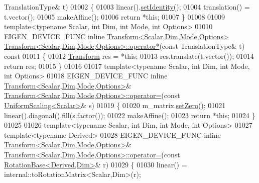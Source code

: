 \begin{DoxyCode}
      TranslationType& t)
01002 \{
01003   linear().\hyperlink{group___geometry___module_a4f0c6b74994904b56b621cf3d9ac4a0f}{setIdentity}();
01004   translation() = t.vector();
01005   makeAffine();
01006   \textcolor{keywordflow}{return} *\textcolor{keyword}{this};
01007 \}
01008 
01009 \textcolor{keyword}{template}<\textcolor{keyword}{typename} Scalar, \textcolor{keywordtype}{int} Dim, \textcolor{keywordtype}{int} Mode, \textcolor{keywordtype}{int} Options>
01010 EIGEN\_DEVICE\_FUNC \textcolor{keyword}{inline} \hyperlink{group___geometry___module_class_eigen_1_1_transform}{Transform<Scalar,Dim,Mode,Options>} 
      \hyperlink{group___geometry___module_a4e44db730819ead6e555cf325cea3fd6}{Transform<Scalar,Dim,Mode,Options>::operator*}(\textcolor{keyword}{const} 
      TranslationType& t)\textcolor{keyword}{ const}
01011 \textcolor{keyword}{}\{
01012   \hyperlink{group___geometry___module_class_eigen_1_1_transform}{Transform} res = *\textcolor{keyword}{this};
01013   res.translate(t.vector());
01014   \textcolor{keywordflow}{return} res;
01015 \}
01016 
01017 \textcolor{keyword}{template}<\textcolor{keyword}{typename} Scalar, \textcolor{keywordtype}{int} Dim, \textcolor{keywordtype}{int} Mode, \textcolor{keywordtype}{int} Options>
01018 EIGEN\_DEVICE\_FUNC \textcolor{keyword}{inline} \hyperlink{group___geometry___module_class_eigen_1_1_transform}{Transform<Scalar,Dim,Mode,Options>}& 
      \hyperlink{group___geometry___module_class_eigen_1_1_transform}{Transform<Scalar,Dim,Mode,Options>::operator=}(\textcolor{keyword}{const} 
      \hyperlink{class_eigen_1_1_uniform_scaling}{UniformScaling<Scalar>}& s)
01019 \{
01020   m\_matrix.\hyperlink{class_eigen_1_1_plain_object_base_ac21ad5f989f320e46958b75ac8d9a1da}{setZero}();
01021   linear().diagonal().fill(s.factor());
01022   makeAffine();
01023   \textcolor{keywordflow}{return} *\textcolor{keyword}{this};
01024 \}
01025 
01026 \textcolor{keyword}{template}<\textcolor{keyword}{typename} Scalar, \textcolor{keywordtype}{int} Dim, \textcolor{keywordtype}{int} Mode, \textcolor{keywordtype}{int} Options>
01027 \textcolor{keyword}{template}<\textcolor{keyword}{typename} Derived>
01028 EIGEN\_DEVICE\_FUNC \textcolor{keyword}{inline} \hyperlink{group___geometry___module_class_eigen_1_1_transform}{Transform<Scalar,Dim,Mode,Options>}& 
      \hyperlink{group___geometry___module_class_eigen_1_1_transform}{Transform<Scalar,Dim,Mode,Options>::operator=}(\textcolor{keyword}{const} 
      \hyperlink{class_eigen_1_1_rotation_base}{RotationBase<Derived,Dim>}& r)
01029 \{
01030   linear() = internal::toRotationMatrix<Scalar,Dim>(r);

\end{DoxyCode}
